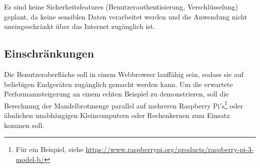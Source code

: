Es sind keine Sicherheitsfeatures (Benutzerauthentisierung, Verschlüsselung) geplant, da keine sensiblen Daten verarbeitet werden und die Anwendung nicht uneingeschränkt über das Internet zugänglich ist.

\subsection{Einschränkungen}

Die Benutzeroberfläche soll in einem Webbrowser lauffähig sein, sodass sie auf beliebigen Endgeräten
zugänglich gemacht werden kann.
Um die erwartete Performanzsteigerung an einem echten Beispiel zu demonstrieren,
soll die Berechnung der Mandelbrotmenge parallel auf mehreren Raspberry Pi’s\footnote{Für ein Beispiel, siehe \url{https://www.raspberrypi.org/products/raspberry-pi-3-model-b/}} oder ähnlichen unabhängigen Kleincomputern oder Rechenkernen zum Einsatz kommen soll.

